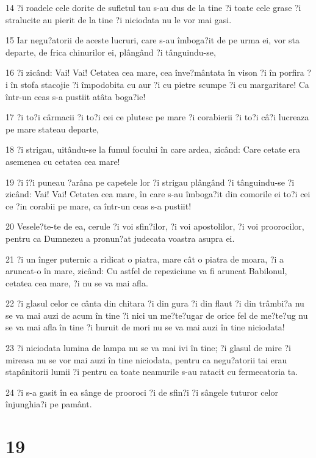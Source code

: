 \par 14 ?i roadele cele dorite de sufletul tau s-au dus de la tine ?i toate cele grase ?i stralucite au pierit de la tine ?i niciodata nu le vor mai gasi.
\par 15 Iar negu?atorii de aceste lucruri, care s-au îmboga?it de pe urma ei, vor sta departe, de frica chinurilor ei, plângând ?i tânguindu-se,
\par 16 ?i zicând: Vai! Vai! Cetatea cea mare, cea înve?mântata în vison ?i în porfira ?i în stofa stacojie ?i împodobita cu aur ?i cu pietre scumpe ?i cu margaritare! Ca într-un ceas s-a pustiit atâta boga?ie!
\par 17 ?i to?i cârmacii ?i to?i cei ce plutesc pe mare ?i corabierii ?i to?i câ?i lucreaza pe mare stateau departe,
\par 18 ?i strigau, uitându-se la fumul focului în care ardea, zicând: Care cetate era asemenea cu cetatea cea mare!
\par 19 ?i î?i puneau ?arâna pe capetele lor ?i strigau plângând ?i tânguindu-se ?i zicând: Vai! Vai! Cetatea cea mare, în care s-au îmboga?it din comorile ei to?i cei ce ?in corabii pe mare, ca într-un ceas s-a pustiit!
\par 20 Vesele?te-te de ea, cerule ?i voi sfin?ilor, ?i voi apostolilor, ?i voi proorocilor, pentru ca Dumnezeu a pronun?at judecata voastra asupra ei.
\par 21 ?i un înger puternic a ridicat o piatra, mare cât o piatra de moara, ?i a aruncat-o în mare, zicând: Cu astfel de repeziciune va fi aruncat Babilonul, cetatea cea mare, ?i nu se va mai afla.
\par 22 ?i glasul celor ce cânta din chitara ?i din gura ?i din flaut ?i din trâmbi?a nu se va mai auzi de acum în tine ?i nici un me?te?ugar de orice fel de me?te?ug nu se va mai afla în tine ?i huruit de mori nu se va mai auzi în tine niciodata!
\par 23 ?i niciodata lumina de lampa nu se va mai ivi în tine; ?i glasul de mire ?i mireasa nu se vor mai auzi în tine niciodata, pentru ca negu?atorii tai erau stapânitorii lumii ?i pentru ca toate neamurile s-au ratacit cu fermecatoria ta.
\par 24 ?i s-a gasit în ea sânge de prooroci ?i de sfin?i ?i sângele tuturor celor înjunghia?i pe pamânt.

\chapter{19}

